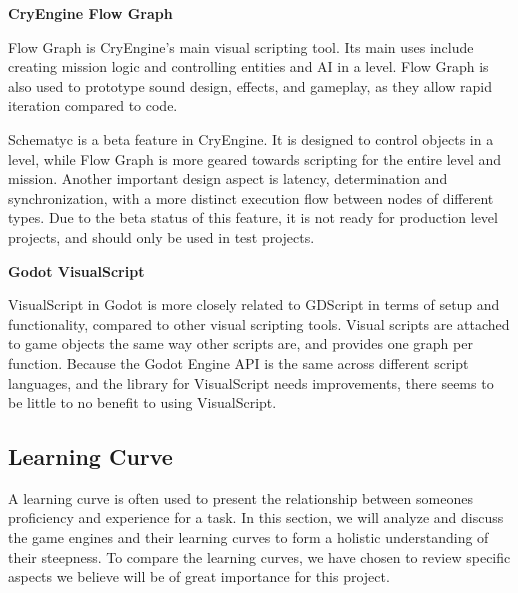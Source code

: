 \textbf{CryEngine Flow Graph} \label{cryengine:flow_graph}

Flow Graph is CryEngine's main visual scripting tool. Its main uses include creating mission logic and controlling entities and AI in a level. Flow Graph is also used to prototype sound design, effects, and gameplay, as they allow rapid iteration compared to code. 

Schematyc is a beta feature in CryEngine. It is designed to control objects in a level, while Flow Graph is more geared towards scripting for the entire level and mission. Another important design aspect is latency, determination and synchronization, with a more distinct execution flow between nodes of different types. Due to the beta status of this feature, it is not ready for production level projects, and should only be used in test projects. \cite{cryengine_schematyc}

\textbf{Godot VisualScript} \label{godot:visualscript}

VisualScript in Godot is more closely related to GDScript in terms of setup and functionality, compared to other visual scripting tools. Visual scripts are attached to game objects the same way other scripts are, and provides one graph per function. \cite{godot_visual_script_tutorial} Because the Godot Engine API is the same across different script languages, and the library for VisualScript needs improvements, there seems to be little to no benefit to using VisualScript.













\subsection{Learning Curve}

A learning curve is often used to present the relationship between someones proficiency and experience for a task. In this section, we will analyze and discuss the game engines and their learning curves to form a holistic understanding of their steepness. To compare the learning curves, we have chosen to review specific aspects we believe will be of great importance for this project.



